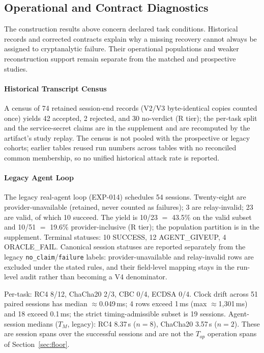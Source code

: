 \subsection{Operational and Contract Diagnostics}\label{sec:diagnostics}
The construction results above concern declared task conditions. Historical
records and corrected contracts explain why a missing recovery cannot always
be assigned to cryptanalytic failure. Their operational populations and weaker
reconstruction support remain separate from the matched and prospective studies.

\paragraph{Historical Transcript Census}\label{sec:historical}
A census of 74 retained session-end records (V2/V3 byte-identical copies
counted once) yields 42 accepted, 2 rejected, and 30 no-verdict (R tier); the
per-task split and the service-secret claims are in the supplement and are
recomputed by the artifact's study replay. The census
is not pooled with the prospective or legacy cohorts; earlier tables reused run
numbers across tables with no reconciled common membership, so no unified
historical attack rate is reported.

\paragraph{Legacy Agent Loop}\label{sec:legacy}
The legacy real-agent loop (EXP-014) schedules 54 sessions. Twenty-eight are
provider-unavailable (retained, never counted as failures); 3 are relay-invalid;
23 are valid, of which 10 succeed. The yield is 10/23 $=$ 43.5\% on the valid
subset and 10/51 $=$ 19.6\% provider-inclusive (R tier); the population
partition is in the supplement. Terminal statuses: 10 SUCCESS, 12 AGENT\_GIVEUP,
4 ORACLE\_FAIL. Canonical session statuses are reported separately from the
legacy \texttt{no\_claim}/\texttt{failure} labels: provider-unavailable and
relay-invalid rows are excluded under the stated rules, and their field-level
mapping stays in the run-level audit rather than becoming a V4 denominator.

Per-task: RC4 8/12, ChaCha20 2/3, CBC 0/4, ECDSA 0/4. Clock drift across 51
paired sessions has median $\approx$0.049\,ms; 4 rows exceed 1\,ms (max
$\approx$1{,}301\,ms) and 18 exceed 0.1\,ms; the strict timing-admissible subset
is 19 sessions. Agent-session medians ($T_M$, legacy): RC4 8.37\,s ($n{=}8$),
ChaCha20 3.57\,s ($n{=}2$). These are session spans over the successful
sessions and are not the $T_{op}$ operation spans of Section~\ref{sec:floor}.

